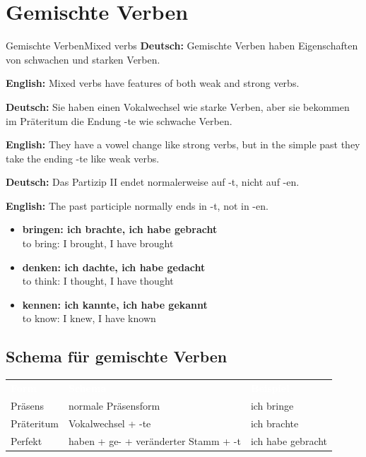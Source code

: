 \documentclass[a4paper,11pt]{article}
\newcommand{\GermanText}[1]{\textbf{Deutsch: }#1\par}
\newcommand{\EnglishText}[1]{{\small\color{SoftGray}\textbf{English: }#1\par}}
\newcommand{\ExampleItem}[2]{\item \textbf{#1}\\{\small\color{SoftGray}#2}}
\begin{document}
    
    \section{Gemischte Verben}
        
        \begin{grammarentry}{Gemischte Verben}{Mixed verbs}
            \GermanText{Gemischte Verben haben Eigenschaften von schwachen und starken Verben.}
            \EnglishText{Mixed verbs have features of both weak and strong verbs.}
            
            \GermanText{Sie haben einen Vokalwechsel wie starke Verben, aber sie bekommen im Präteritum die Endung -te wie schwache Verben.}
            \EnglishText{They have a vowel change like strong verbs, but in the simple past they take the ending -te like weak verbs.}
            
            \GermanText{Das Partizip II endet normalerweise auf -t, nicht auf -en.}
            \EnglishText{The past participle normally ends in -t, not in -en.}
            
            \begin{exbox}
                \begin{itemize}
                    \ExampleItem{bringen: ich brachte, ich habe gebracht}{to bring: I brought, I have brought}
                    \ExampleItem{denken: ich dachte, ich habe gedacht}{to think: I thought, I have thought}
                    \ExampleItem{kennen: ich kannte, ich habe gekannt}{to know: I knew, I have known}
                \end{itemize}
            \end{exbox}
        \end{grammarentry}
        
        \subsection{Schema für gemischte Verben}
            
            \begin{tabular}{>{\raggedright\arraybackslash}p{4cm} >{\raggedright\arraybackslash}p{5cm} >{\raggedright\arraybackslash}p{5cm}}
                \rowcolor{HeaderBlueDark}
                \textcolor{white}{\textbf{Form}} &
                \textcolor{white}{\textbf{Schema}} &
                \textcolor{white}{\textbf{Beispiel}} \\
                
                \rowcolor{RowBlueLight}
                Präsens &
                normale Präsensform &
                ich bringe \\
                
                \rowcolor{RowBlueDark}
                Präteritum &
                Vokalwechsel + -te &
                ich brachte \\
                
                \rowcolor{RowBlueLight}
                Perfekt &
                haben + ge- + veränderter Stamm + -t &
                ich habe gebracht \\
            \end{tabular}
    
\end{document}
